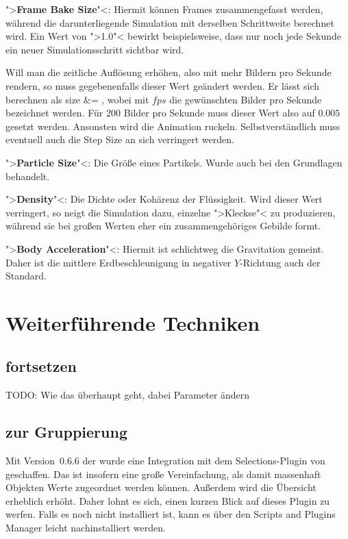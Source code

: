 \documentclass[10pt,DIV=14,a4paper]{scrartcl}
\begin{document}
	\item ">\textbf{Frame Bake Size}"<: Hiermit können Frames
	zusammengefasst werden, während die darunterliegende Simulation mit
	derselben Schrittweite berechnet wird. Ein Wert von ">1.0"< bewirkt
	beispielsweise, dass nur noch jede Sekunde ein neuer
	Simulationsschritt sichtbar wird.

	Will man die zeitliche Auflösung erhöhen, also mit mehr Bildern pro
	Sekunde rendern, so muss gegebenenfalls dieser Wert geändert
	werden. Er lässt sich berechnen als
	\aleq
	{
		size &=  \qq ,
	}
	wobei mit $fps$ die gewünschten Bilder pro Sekunde bezeichnet
	werden. Für 200 Bilder pro Sekunde muss dieser Wert also auf $0.005$
	gesetzt werden. Ansonsten wird die Animation ruckeln.
	Selbstverständlich muss eventuell auch die Step Size an sich
	verringert werden.

	\item ">\textbf{Particle Size}"<: Die Größe eines Partikels. Wurde
	auch bei den Grundlagen behandelt.

	\item ">\textbf{Density}"<: Die Dichte oder Kohärenz der
	Flüssigkeit. Wird dieser Wert verringert, so neigt die Simulation
	dazu, einzelne ">Kleckse"< zu produzieren, während sie bei großen
	Werten eher ein zusammengehöriges Gebilde formt.

	\item ">\textbf{Body Acceleration}"<: Hiermit ist schlichtweg die
	Gravitation gemeint. Daher ist die mittlere Erdbeschleunigung in
	negativer $Y$-Richtung auch der Standard.

\itE




\pagebreak
\section{Weiterführende Techniken}

\subsection{ fortsetzen}
TODO: Wie das überhaupt geht, dabei Parameter ändern

\subsection{ zur Gruppierung}
Mit Version~0.6.6 der \fluidsim wurde eine Integration mit dem
Selections-Plugin von \aoi geschaffen. Das ist insofern eine große
Vereinfachung, als damit massenhaft Objekten Werte zugeordnet werden
können. Außerdem wird die Übersicht erheblich erhöht. Daher lohnt es
sich, einen kurzen Blick auf dieses Plugin zu werfen. Falls es noch
nicht installiert ist, kann es über den Scripts and Plugins Manager
leicht nachinstalliert werden.
\end{document}
